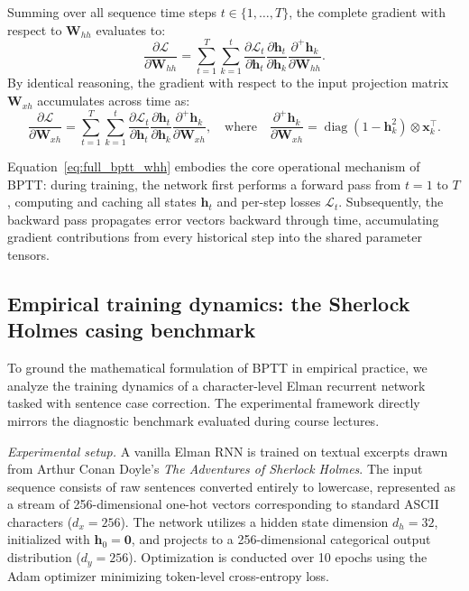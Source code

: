 \documentclass[../../../main.tex]{subfiles}
\begin{document}
Summing over all sequence time steps $t \in \{1, \dots, T\}$, the complete gradient with respect to $\mathbf{W}_{hh}$ evaluates to:
\begin{equation}
\frac{\partial \mathcal{L}}{\partial \mathbf{W}_{hh}} = \sum_{t=1}^T \sum_{k=1}^t \frac{\partial \mathcal{L}_t}{\partial \mathbf{h}_t} \frac{\partial \mathbf{h}_t}{\partial \mathbf{h}_k} \frac{\partial^+ \mathbf{h}_k}{\partial \mathbf{W}_{hh}}.
\label{eq:full_bptt_whh}
\end{equation}
By identical reasoning, the gradient with respect to the input projection matrix $\mathbf{W}_{xh}$ accumulates across time as:
\begin{equation}
\frac{\partial \mathcal{L}}{\partial \mathbf{W}_{xh}} = \sum_{t=1}^T \sum_{k=1}^t \frac{\partial \mathcal{L}_t}{\partial \mathbf{h}_t} \frac{\partial \mathbf{h}_t}{\partial \mathbf{h}_k} \frac{\partial^+ \mathbf{h}_k}{\partial \mathbf{W}_{xh}}, \quad \text{where} \quad \frac{\partial^+ \mathbf{h}_k}{\partial \mathbf{W}_{xh}} = \operatorname{diag}\left(1 - \mathbf{h}_k^2\right) \otimes \mathbf{x}_k^\top.
\label{eq:full_bptt_wxh}
\end{equation}

Equation~\ref{eq:full_bptt_whh} embodies the core operational mechanism of BPTT: during training, the network first performs a forward pass from $t=1$ to $T$, computing and caching all states $\mathbf{h}_t$ and per-step losses $\mathcal{L}_t$. Subsequently, the backward pass propagates error vectors backward through time, accumulating gradient contributions from every historical step into the shared parameter tensors.

\subsection{Empirical training dynamics: the Sherlock Holmes casing benchmark}
\label{subsec:rnn_sherlock_holmes_casing}

To ground the mathematical formulation of BPTT in empirical practice, we analyze the training dynamics of a character-level Elman recurrent network tasked with sentence case correction. The experimental framework directly mirrors the diagnostic benchmark evaluated during course lectures.

\textit{Experimental setup.} A vanilla Elman RNN is trained on textual excerpts drawn from Arthur Conan Doyle's \textit{The Adventures of Sherlock Holmes}. The input sequence consists of raw sentences converted entirely to lowercase, represented as a stream of 256-dimensional one-hot vectors corresponding to standard ASCII characters ($d_x = 256$). The network utilizes a hidden state dimension $d_h = 32$, initialized with $\mathbf{h}_0 = \mathbf{0}$, and projects to a 256-dimensional categorical output distribution ($d_y = 256$). Optimization is conducted over 10 epochs using the Adam optimizer \citep{kingma2014adam} minimizing token-level cross-entropy loss.
\end{document}
